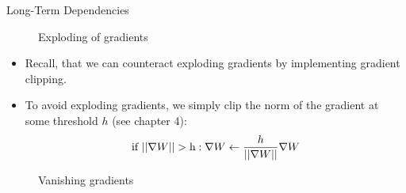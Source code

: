 \begin{vbframe}{Long-Term Dependencies}
  \framebreak
  \begin{figure}
      \centering
      \caption{\footnotesize {Exploding of gradients}}
  \end{figure}

  \begin{itemize}
    \item Recall, that we can counteract exploding gradients by implementing gradient clipping.
    \item To avoid exploding gradients, we simply clip the norm of the gradient at some threshold $h$ (see chapter 4): $$\text{if  } ||\nabla W|| > \text h: \nabla W \leftarrow \frac{h}{||\nabla W||} \nabla W $$
  \end{itemize}

\framebreak

  \begin{figure}
      \centering
      \caption{\footnotesize {Vanishing gradients}}
  \end{figure}



\end{vbframe}

